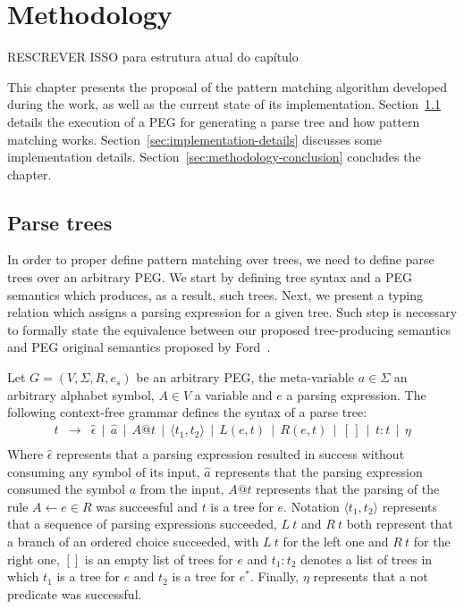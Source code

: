 \chapter{Methodology}\label{chap:methodology}

RESCREVER ISSO para estrutura atual do capítulo

This chapter presents the proposal of the pattern matching algorithm developed
during the work, as well as the  current state of its implementation.
Section~\ref{sec:parse-tress} details
the execution of a PEG for generating a parse tree and how pattern matching works.
Section~\ref{sec:implementation-details} discusses some implementation details.
Section~\ref{sec:methodology-conclusion} concludes the chapter.

\section{Parse trees}\label{sec:parse-tress}

In order to proper define pattern matching over trees, we need
to define parse trees over an arbitrary PEG. We start by defining
tree syntax and a PEG semantics which produces, as a result, such
trees. Next, we present a typing relation which assigns a parsing
expression for a given tree. Such step is necessary to formally
state the equivalence between our proposed tree-producing semantics
and PEG original semantics proposed by Ford~\cite{Ford04}.

Let \(G = (V, \Sigma, R, e_s)\) be an arbitrary PEG, the meta-variable \(a \in \Sigma\) an
arbitrary alphabet symbol, \(A \in V\) a variable and \(e\) a parsing expression.
The following context-free grammar defines the syntax of a parse tree:
\[
   \begin{array}{lcl}
      t & \to & \hat{\epsilon} \, \mid \, \hat{a} \, \mid \, A@t\,
                    \mid \, \langle t_1, t_2 \rangle\,
                    \mid \, L(e,t) \, \mid \, R(e,t) \, \mid \, [\,] \,\mid\,t:t\,
                    \mid \, \eta \\
   \end{array}
\]
Where \(\hat{\epsilon}\) represents that a parsing expression resulted in
success without consuming any symbol of its input, \(\hat{a}\) represents that
the parsing expression consumed the symbol \(a\) from the input, \(A@t\)
represents that the parsing of the rule \(A \leftarrow e \in R\) was succeesful
and $t$ is a tree for $e$. Notation
\(\langle t_1, t_2 \rangle\) represents that a sequence of parsing expressions
succeeded,
\(L \: t\) and \(R \: t\) both represent that a branch of an ordered choice succeeded,
with \(L \: t\) for the left one and \(R \: t\) for the right one,
\([]\) is an empty list of trees for $e$ and \(t_1 : t_2\) denotes a list of
trees in which $t_1$ is a tree for $e$ and $t_2$ is a tree for $e^*$. Finally,
\(\eta\) represents that a not
predicate was successful.

